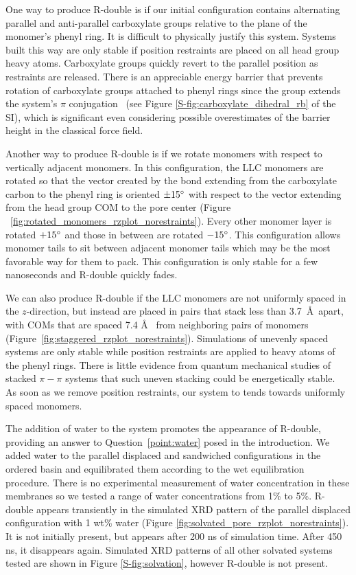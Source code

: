 \documentclass[journal=jpcbfk,manuscript=article]{achemso}
\begin{document}
  One way to produce R-double is if our initial configuration contains
  alternating parallel and anti-parallel carboxylate groups relative to the plane
  of the monomer's phenyl ring. It is difficult to physically justify this
  system. Systems built this way are only stable if position restraints are
  placed on all head group heavy atoms. Carboxylate groups quickly revert to the
  parallel position as restraints are released. There is an appreciable energy
  barrier that prevents rotation of carboxylate groups attached to phenyl rings
  since the group extends the system's $\pi$ conjugation~\cite{carey_organic_2011} (see Figure
  \ref{S-fig:carboxylate_dihedral_rb} of the SI), which is significant even considering
  possible overestimates of the barrier height in the classical force field. 

  Another way to produce R-double is if we rotate monomers with respect to
  vertically adjacent monomers. In this configuration, the LLC monomers are rotated so
  that the vector created by the bond extending from the carboxylate carbon to
  the phenyl ring is oriented $\pm 15 \degree$ with respect to the vector
  extending from the head group COM to the pore center (Figure
  ~\ref{fig:rotated_monomers_rzplot_norestraints}). Every other monomer layer is
  rotated $+15 \degree$ and those in between are rotated $-15 \degree$. This
  configuration allows monomer tails to sit between adjacent monomer tails which
  may be the most favorable way for them to pack. This configuration is only
  stable for a few nanoseconds and R-double quickly fades.  
  
  We can also produce R-double if the LLC monomers are not uniformly spaced in
  the $z$-direction, but instead are placed in pairs that stack less than
  3.7~\AA~apart, with COMs that are spaced 7.4 \AA~ from neighboring pairs of
  monomers (Figure~\ref{fig:staggered_rzplot_norestraints}). Simulations of
  unevenly spaced systems are only stable while position restraints are applied
  to heavy atoms of the phenyl rings. There is little evidence from quantum
  mechanical studies of stacked $\pi-\pi$ systems that such uneven stacking could
  be energetically stable.~\cite{tauer_beyond_2005} As soon as we remove position
  restraints, our system to tends towards uniformly spaced monomers. 
 
  The addition of water to the system promotes the appearance of R-double,
  providing an answer to Question~\ref{point:water} posed in the introduction.
  We added water to the parallel displaced and sandwiched configurations in the
  ordered basin and equilibrated them according to the wet equilibration
  procedure. There is no experimental measurement of water concentration in these
  membranes so we tested a range of water concentrations from 1\% to 5\%.
  R-double appears transiently in the simulated XRD pattern of the parallel
  displaced configuration with 1 wt\% water (Figure
  \ref{fig:solvated_pore_rzplot_norestraints}). It is not initially present, but
  appears after 200 ns of simulation time. After 450 ns, it disappears again.
  Simulated XRD patterns of all other solvated systems tested are shown in Figure
  \ref{S-fig:solvation}, however R-double is not present.
\end{document}
